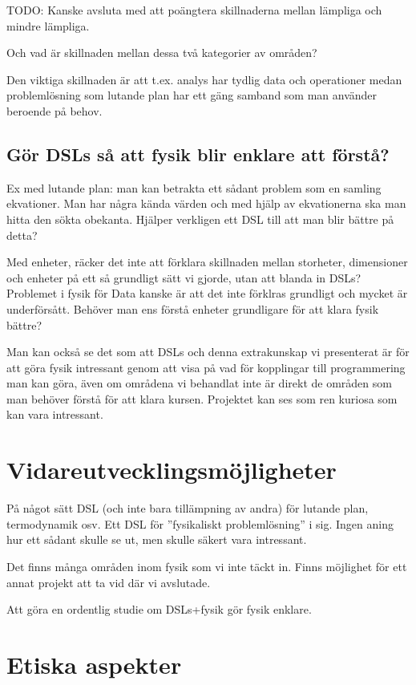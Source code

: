 \begin{binge}
TODO: Kanske avsluta med att poängtera skillnaderna mellan lämpliga och mindre lämpliga.

Och vad är skillnaden mellan dessa två kategorier av områden?

Den viktiga skillnaden är att t.ex. analys har tydlig data och operationer
medan problemlösning som lutande plan har ett gäng samband som man använder
beroende på behov.

\subsection{Gör DSLs så att fysik blir enklare att förstå?}
\label{sec:bara_fysik}

Ex med lutande plan: man kan betrakta ett sådant problem som en samling
ekvationer. Man har några kända värden och med hjälp av ekvationerna ska man
hitta den sökta obekanta. Hjälper verkligen ett DSL till att man blir bättre på
detta?

Med enheter, räcker det inte att förklara skillnaden mellan storheter,
dimensioner och enheter på ett så grundligt sätt vi gjorde, utan att blanda in
DSLs? Problemet i fysik för Data kanske är att det inte förklras grundligt och
mycket är underförsått. Behöver man ens förstå enheter grundligare för att
klara fysik bättre?

Man kan också se det som att DSLs och denna extrakunskap vi presenterat är för
att göra fysik intressant genom att visa på vad för kopplingar till
programmering man kan göra, även om områdena vi behandlat inte är direkt de
områden som man behöver förstå för att klara kursen. Projektet kan ses som ren
kuriosa som kan vara intressant.

\section{Vidareutvecklingsmöjligheter}

På något sätt DSL (och inte bara tillämpning av andra) för lutande plan, termodynamik osv. Ett DSL för ''fysikaliskt problemlösning'' i sig. Ingen aning hur ett sådant skulle se ut, men skulle säkert vara intressant.

Det finns många områden inom fysik som vi inte täckt in. Finns möjlighet för ett
annat projekt att ta vid där vi avslutade.

Att göra en ordentlig studie om DSLs+fysik gör fysik enklare.

\section{Etiska aspekter}


\end{binge}
